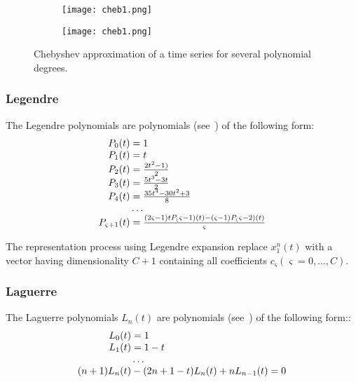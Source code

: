 \begin{figure}
  \centering
  \begin{subfigure}{.5\textwidth}
    \centering
    \texttt{[image: cheb1.png]}
    \label{fig:sub1}
  \end{subfigure}%
  \begin{subfigure}{.5\textwidth}
    \centering
    \texttt{[image: cheb1.png]}
    \label{fig:sub2}
  \end{subfigure}
  \caption{Chebyshev approximation of a time series for several polynomial degrees.}
  \label{fig:chebyshev}
\end{figure}

\subsubsection{Legendre}
\label{sec:Legendre}

The Legendre polynomials are polynomials (see~\cite{}) of the following form:
\begin{equation}
\begin{array}{r@{}l}
  P_0(t)&{}=1 \\
  P_1(t)&{}=t \\
  P_2(t)&{}=\frac{2 t^2-1)}{2} \\
  P_3(t)&{}=\frac{5 t^3-3t}{2} \\
  P_4(t)&{}=\frac{35 t^4-30 t^2+3}{8} \\
        &{}\ldots \\
  P_{\varsigma+1}(t)&{}=\frac{(2 \varsigma-1)  t P_(\varsigma-1)(t)-(\varsigma-1) P_(\varsigma-2) (t)}{\varsigma}
  \label{eq:LegendrePolynomialCoeffs}
\end{array}
\end{equation}

The representation process using Legendre expansion replace $x_1^n (t)$ with a vector having dimensionality $C+1$ 
containing all coefficients $c_\varsigma  (\varsigma=0,…,C)$. 

\subsubsection{Laguerre}
\label{sec:Laguerre}
The Laguerre polynomials $L_n(t)$ are polynomials (see~\cite{}) of the following form::
\begin{equation}
\begin{array}{r@{}l}
  L_0(t)&{}=1 \\
  L_1(t)&{}=1-t \\
        &{}\ldots \\
  (n+1) L_n(t)&{}-(2n+1-t) L_n(t)+n L_{n-1}(t)=0
  \label{eq:LaguerrePolynomialCoeffs}
\end{array}
\end{equation}


